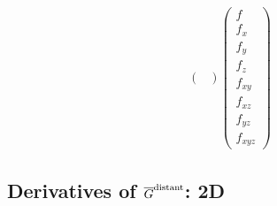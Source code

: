 \documentclass[letterpaper]{article}
\newcommand{\GB}{\overline{G}}
\begin{document}
\begin{align*}
 \left(\begin{array}{cccccccc}
 \end{array}\right)
 \left(\begin{array}{c}
 f \\ f_x \\ f_y \\ f_z \\ f_{xy} \\ f_{xz} \\ f_{yz} \\ f_{xyz}
 \end{array}\right)
\end{align*}

\subsection{Derivatives of $\GB\sups{distant}$: 2D}
\end{document}
